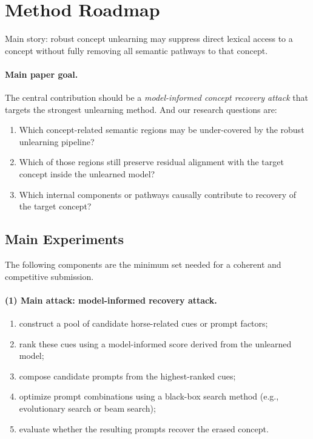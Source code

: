 \section{Method Roadmap}
\label{sec:method_roadmap}

Main story: {robust concept unlearning may suppress direct lexical access to a concept without fully removing all semantic pathways to that concept}. 

\paragraph{Main paper goal.}
The central contribution should be a \emph{model-informed concept recovery attack} that targets the strongest unlearning method. And our research questions are:
\begin{enumerate}
    \item Which concept-related semantic regions may be under-covered by the robust unlearning pipeline?
    \item Which of those regions still preserve residual alignment with the target concept inside the unlearned model?
    \item Which internal components or pathways causally contribute to recovery of the target concept?
\end{enumerate}

\subsection{Main Experiments}
\label{subsec:must_have_components}

The following components are the minimum set needed for a coherent and competitive submission.

\paragraph{(1) Main attack: model-informed recovery attack.}
\begin{enumerate}
    \item construct a pool of candidate horse-related cues or prompt factors;
    \item rank these cues using a model-informed score derived from the unlearned model;
    \item compose candidate prompts from the highest-ranked cues;
    \item optimize prompt combinations using a black-box search method (e.g., evolutionary search or beam search);
    \item evaluate whether the resulting prompts recover the erased concept.
\end{enumerate}

